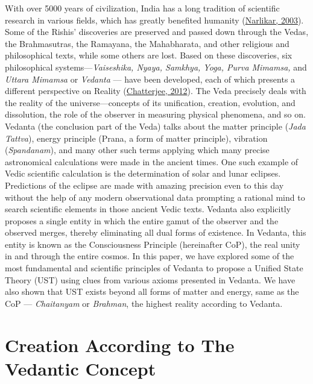 \documentclass[twoside, 13pt]{article}
\begin{document}
{{\fontsize{12}{14}\selectfont With over 5000 years of civilization, India has a long tradition of scientific research in various fields, which has greatly benefited humanity (\underline{Narlikar, 2003}). Some of the Rishis’ discoveries are preserved and passed down through the Vedas, the Brahmasutras, the Ramayana, the Mahabharata, and other religious and philosophical texts, while some others are lost. Based on these discoveries, six philosophical systems—\textit{Vaiseshika, Nyaya, Samkhya, Yoga, Purva Mimamsa,} and \textit{Uttara Mimamsa} or \textit{Vedanta} — have been developed, each of which presents a different perspective on Reality (\underline{Chatterjee, 2012}). The Veda precisely deals with the reality of the universe—concepts of its unification, creation, evolution, and dissolution, the role of the observer in measuring physical phenomena, and so on. Vedanta (the conclusion part of the Veda) talks about the matter principle (\textit{Jada Tattva}), energy principle (Prana, a form of matter principle), vibration (\textit{Spandanam}), and many other such terms applying which many precise astronomical calculations were made in the ancient times. One such example of Vedic scientific calculation is the determination of solar and lunar eclipses. Predictions of the eclipse are made with amazing precision even to this day without the help of any modern observational data prompting a rational mind to search scientific elements in those ancient Vedic texts. Vedanta also explicitly proposes a single entity in which the entire gamut of the observer and the observed merges, thereby eliminating all dual forms of existence. In Vedanta, this entity is known as the Consciousness Principle (hereinafter CoP), the real unity in and through the entire cosmos. In this paper, we have explored some of the most fundamental and scientific principles of Vedanta to propose a Unified State Theory (UST) using clues from various axioms presented in Vedanta. We have also shown that UST exists beyond all forms of matter and energy, same as the CoP — \textit{Chaitanyam} or \textit{Brahman}, the highest reality according to Vedanta.}


{\fontsize{18}{20}\selectfont\section{Creation According to The Vedantic Concept}}\label{sec-2}

\vspace{-.3cm}

}
\end{document}
